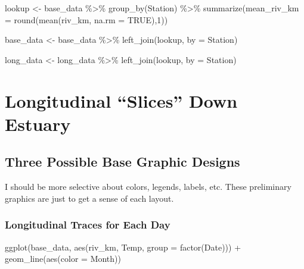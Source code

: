 \documentclass[
]{article}
\newenvironment{Shaded}{\begin{snugshade}}{\end{snugshade}}
\newcommand{\AttributeTok}[1]{\textcolor[rgb]{0.77,0.63,0.00}{#1}}
\newcommand{\ConstantTok}[1]{\textcolor[rgb]{0.00,0.00,0.00}{#1}}
\newcommand{\DecValTok}[1]{\textcolor[rgb]{0.00,0.00,0.81}{#1}}
\newcommand{\FunctionTok}[1]{\textcolor[rgb]{0.00,0.00,0.00}{#1}}
\newcommand{\NormalTok}[1]{#1}
\newcommand{\OtherTok}[1]{\textcolor[rgb]{0.56,0.35,0.01}{#1}}
\newcommand{\SpecialCharTok}[1]{\textcolor[rgb]{0.00,0.00,0.00}{#1}}
\newcommand{\StringTok}[1]{\textcolor[rgb]{0.31,0.60,0.02}{#1}}
\begin{document}
\begin{Shaded}
\begin{Highlighting}[]
\NormalTok{lookup }\OtherTok{\textless{}{-}}\NormalTok{ base\_data }\SpecialCharTok{\%\textgreater{}\%}
  \FunctionTok{group\_by}\NormalTok{(Station) }\SpecialCharTok{\%\textgreater{}\%}
  \FunctionTok{summarize}\NormalTok{(}\AttributeTok{mean\_riv\_km =} \FunctionTok{round}\NormalTok{(}\FunctionTok{mean}\NormalTok{(riv\_km, }\AttributeTok{na.rm =} \ConstantTok{TRUE}\NormalTok{),}\DecValTok{1}\NormalTok{))}

\NormalTok{base\_data }\OtherTok{\textless{}{-}}\NormalTok{ base\_data }\SpecialCharTok{\%\textgreater{}\%}
  \FunctionTok{left\_join}\NormalTok{(lookup, }\AttributeTok{by =} \StringTok{\textquotesingle{}Station\textquotesingle{}}\NormalTok{)}

\NormalTok{long\_data }\OtherTok{\textless{}{-}}\NormalTok{ long\_data }\SpecialCharTok{\%\textgreater{}\%}
  \FunctionTok{left\_join}\NormalTok{(lookup, }\AttributeTok{by =} \StringTok{\textquotesingle{}Station\textquotesingle{}}\NormalTok{)}
\end{Highlighting}
\end{Shaded}

\hypertarget{longitudinal-slices-down-estuary}{%
\section{Longitudinal ``Slices'' Down
Estuary}\label{longitudinal-slices-down-estuary}}

\hypertarget{three-possible-base-graphic-designs}{%
\subsection{Three Possible Base Graphic
Designs}\label{three-possible-base-graphic-designs}}

I should be more selective about colors, legends, labels, etc. These
preliminary graphics are just to get a sense of each layout.

\hypertarget{longitudinal-traces-for-each-day}{%
\subsubsection{Longitudinal Traces for Each
Day}\label{longitudinal-traces-for-each-day}}

\begin{Shaded}
\begin{Highlighting}[]
\FunctionTok{ggplot}\NormalTok{(base\_data, }\FunctionTok{aes}\NormalTok{(riv\_km, Temp, }\AttributeTok{group =} \FunctionTok{factor}\NormalTok{(Date))) }\SpecialCharTok{+}
  \FunctionTok{geom\_line}\NormalTok{(}\FunctionTok{aes}\NormalTok{(}\AttributeTok{color =}\NormalTok{ Month))}
\end{Highlighting}
\end{Shaded}
\end{document}
